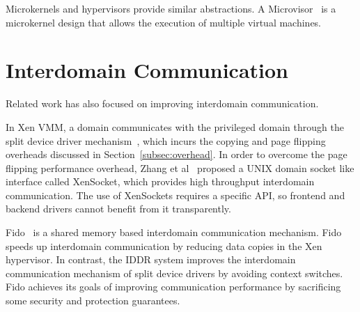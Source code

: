 Microkernels and hypervisors provide similar abstractions\cite{Heiser+:osr2006, hand2005virtual}.
A Microvisor~\cite{Heiser+:acm10} is a microkernel design that allows
the execution of multiple virtual machines.

\section{Interdomain Communication}
\label{sec:interdomain}
Related work has also focused on improving interdomain communication.

In Xen VMM, a domain communicates with the privileged domain
through the split device driver mechanism~\cite{Fraser04safehardware},
which incurs the copying and page flipping overheads discussed in Section~\ref{subsec:overhead}.
In order to overcome the page flipping performance overhead, 
Zhang et al~\cite{Zhang:2007:XHI:1516124.1516138} proposed a UNIX domain socket 
like interface called XenSocket, which provides high throughput 
interdomain communication.  The use of XenSockets requires a specific API,
so frontend and backend drivers cannot benefit from it transparently.

Fido~\cite{Burtsev:2009:FFI:1855807.1855832} is a shared memory
based interdomain communication mechanism. Fido speeds up
interdomain communication by reducing data copies in the
Xen hypervisor. In contrast, the IDDR system improves the interdomain
communication mechanism of split device drivers by avoiding context
switches. Fido achieves its goals of improving communication performance
by sacrificing some security and protection guarantees.

